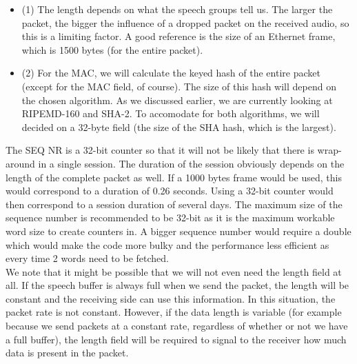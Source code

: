 \documentclass[a4paper]{article}
\begin{document}
\begin{itemize}
  \item (1) The length depends on what the speech groups tell us. The larger the packet, the bigger the influence of a dropped packet on the received audio, so this is a limiting factor. A good reference is the size of an Ethernet frame, which is 1500 bytes (for the entire packet).
  \item (2) For the MAC, we will calculate the keyed hash of the entire packet (except for the MAC field, of course). The size of this hash will depend on the chosen algorithm. As we discussed earlier, we are currently looking at RIPEMD-160 and SHA-2. To accomodate for both algorithms, we will decided on a 32-byte field (the size of the SHA hash, which is the largest). 
\end{itemize}

The SEQ NR is a 32-bit counter so that it will not be likely that there is wrap-around in a single session. The duration of the session obviously depends on the length of the complete packet as well. If a 1000 bytes frame would be used, this would correspond to a duration of 0.26 seconds. Using a 32-bit counter would then correspond to a session duration of several days. The maximum size of the sequence number is recommended to be 32-bit as it is the maximum workable word size to create counters in. A bigger sequence number would require a double which would make the code more bulky and the performance less efficient as every time 2 words need to be fetched.\\

We note that it might be possible that we will not even need the length field at all. If the speech buffer is always full when we send the packet, the length will be constant and the receiving side can use this information. In this situation, the packet rate is not constant. However, if the data length is variable (for example because we send packets at a constant rate, regardless of whether or not we have a full buffer), the length field will be required to signal to the receiver how much data is present in the packet.
\end{document}
